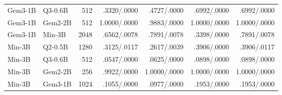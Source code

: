 \documentclass{article}
\theoremstyle{plain}
\theoremstyle{definition}
\theoremstyle{remark}
\begin{document}
\begin{longtable}{@{}llrrrrr@{}}
\rowcolor{rowII} Gem3-1B & Q3-0.6B & 512 & .3320/.0000 & .4727/.0000 & .6992/.0000 & .6992/.0000 \\
\rowcolor{rowII} Gem3-1B & Gem2-2B & 512 & 1.0000/.0000 & .9883/.0000 & 1.0000/.0000 & 1.0000/.0000 \\
\rowcolor{rowII} Gem3-1B & Min-3B & 2048 & .6562/.0078 & .7891/.0078 & .3398/.0000 & .7891/.0078 \\
\rowcolor{rowIP} Min-3B & Q2-0.5B & 1280 & .3125/.0117 & .2617/.0039 & .3906/.0000 & .3906/.0117 \\
\rowcolor{rowII} Min-3B & Q3-0.6B & 512 & .0547/.0000 & .0625/.0000 & .0898/.0000 & .0898/.0000 \\
\rowcolor{rowII} Min-3B & Gem2-2B & 256 & .9922/.0000 & 1.0000/.0000 & 1.0000/.0000 & 1.0000/.0000 \\
\rowcolor{rowII} Min-3B & Gem3-1B & 1024 & .1055/.0000 & .0977/.0000 & .1953/.0000 & .1953/.0000 \\
\end{longtable}
\endgroup

\end{document}
